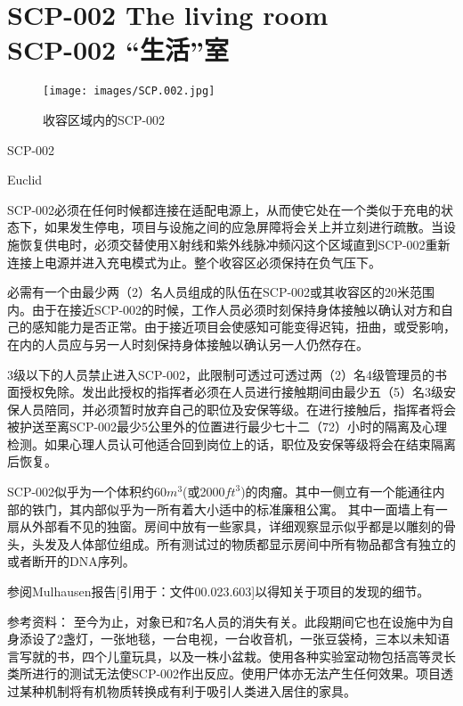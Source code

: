 \chapter[SCP-002 “生活”室]{
	SCP-002 The living room \\
	SCP-002 “生活”室
}

\label{chap:SCP-002}

\begin{figure}[H]
	\centering
	\texttt{[image: images/SCP.002.jpg]}
	\caption*{收容区域内的SCP-002}
\end{figure}

SCP-002

Euclid

SCP-002必须在任何时候都连接在适配电源上，从而使它处在一个类似于充电的状态下，如果发生停电，项目与设施之间的应急屏障将会关上并立刻进行疏散。当设施恢复供电时，必须交替使用X射线和紫外线脉冲频闪这个区域直到SCP-002重新连接上电源并进入充电模式为止。整个收容区必须保持在负气压下。

必需有一个由最少两（2）名人员组成的队伍在SCP-002或其收容区的20米范围内。由于在接近SCP-002的时候，工作人员必须时刻保持身体接触以确认对方和自己的感知能力是否正常。由于接近项目会使感知可能变得迟钝，扭曲，或受影响，在内的人员应与另一人时刻保持身体接触以确认另一人仍然存在。

3级以下的人员禁止进入SCP-002，此限制可透过可透过两（2）名4级管理员的书面授权免除。发出此授权的指挥者必须在人员进行接触期间由最少五（5）名3级安保人员陪同，并必须暂时放弃自己的职位及安保等级。在进行接触后，指挥者将会被护送至离SCP-002最少5公里外的位置进行最少七十二（72）小时的隔离及心理检测。如果心理人员认可他适合回到岗位上的话，职位及安保等级将会在结束隔离后恢复。

SCP-002似乎为一个体积约60$m^3$(或2000${ft}^3$)的肉瘤。其中一侧立有一个能通往内部的铁门，其内部似乎为一所有着大小适中的标准廉租公寓。 其中一面墙上有一扇从外部看不见的独窗。房间中放有一些家具，详细观察显示似乎都是以雕刻的骨头，头发及人体部位组成。所有测试过的物质都显示房间中所有物品都含有独立的或者断开的DNA序列。

参阅Mulhausen报告[引用于：文件00.023.603]以得知关于项目的发现的细节。

参考资料： 至今为止，对象已和7名人员的消失有关。此段期间它也在设施中为自身添设了2盏灯，一张地毯，一台电视，一台收音机，一张豆袋椅，三本以未知语言写就的书，四个儿童玩具，以及一株小盆栽。使用各种实验室动物包括高等灵长类所进行的测试无法使SCP-002作出反应。使用尸体亦无法产生任何效果。项目透过某种机制将有机物质转换成有利于吸引人类进入居住的家具。

